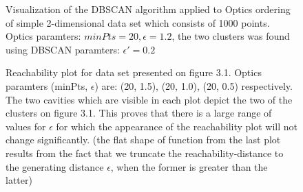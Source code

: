 \begin{figure}
  \centering
  \caption{Visualization of the DBSCAN algorithm applied to Optics ordering
  of simple 2-dimensional data set which consists of 1000 points. Optics
  paramters: $minPts=20, \epsilon=1.2$, the two clusters was found using DBSCAN
  paramters: $\epsilon'=0.2$ }
  \label{clusters}
\end{figure}


\begin{figure}
  \centering
  \caption{Reachability plot for data set presented on figure 3.1. Optics
  paramters (minPts, $\epsilon$) are: (20, 1.5), (20, 1.0), (20, 0.5)
  respectively. The two cavities which are visible in each plot depict the two
  of the clusters on figure 3.1. This proves that there is a large range of
  values for $\epsilon$ for which the appearance of the reachability plot will
  not change significantly. (the flat shape of function from the last plot
  results from the fact that we truncate the reachability-distance to the 
  generating distance $\epsilon$, when the former is greater than the latter)}
  \label{reach}
\end{figure}